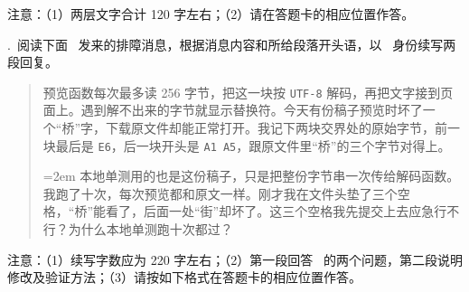 \documentclass[UTF8, zihao=5, a4paper, fontset=fandol]{ctexart}
\begin{document}
\noindent 注意：（1）两层文字合计 120 字左右；（2）请在答题卡的相应位置作答。

\smallskip
\noindent\arole
{}

\newpage
{}

.~阅读下面 \utag~发来的排障消息，根据消息内容和所给段落开头语，以 \atag~身份续写两段回复。

\begin{quote}
\kaishu\noindent\urole 预览函数每次最多读 256 字节，把这一块按 \texttt{UTF-8} 解码，再把文字接到页面上。遇到解不出来的字节就显示替换符。今天有份稿子预览时坏了一个“桥”字，下载原文件却能正常打开。我记下两块交界处的原始字节，前一块最后是 \texttt{E6}，后一块开头是 \texttt{A1 A5}，跟原文件里“桥”的三个字节对得上。

\parindent=2em 本地单测用的也是这份稿子，只是把整份字节串一次传给解码函数。我跑了十次，每次预览都和原文一样。刚才我在文件头垫了三个空格，“桥”能看了，后面一处“街”却坏了。这三个空格我先提交上去应急行不行？为什么本地单测跑十次都过？
\end{quote}

\noindent 注意：（1）续写字数应为 220 字左右；（2）第一段回答 \utag~的两个问题，第二段说明修改及验证方法；（3）请按如下格式在答题卡的相应位置作答。

\smallskip
\noindent\arole
{}

\end{document}
